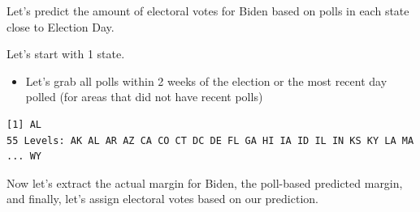 \documentclass[
  letterpaper,
  DIV=11,
  numbers=noendperiod]{scrreprt}
\newenvironment{Shaded}{\begin{snugshade}}{\end{snugshade}}
\newcommand{\DecValTok}[1]{\textcolor[rgb]{0.68,0.00,0.00}{#1}}
\newcommand{\DocumentationTok}[1]{\textcolor[rgb]{0.37,0.37,0.37}{\textit{#1}}}
\newcommand{\FunctionTok}[1]{\textcolor[rgb]{0.28,0.35,0.67}{#1}}
\newcommand{\NormalTok}[1]{\textcolor[rgb]{0.00,0.23,0.31}{#1}}
\newcommand{\OtherTok}[1]{\textcolor[rgb]{0.00,0.23,0.31}{#1}}
\newcommand{\SpecialCharTok}[1]{\textcolor[rgb]{0.37,0.37,0.37}{#1}}
\providecommand{\tightlist}{%
  \setlength{\itemsep}{0pt}\setlength{\parskip}{0pt}}\usepackage{longtable,booktabs,array}
\begin{document}
Let's predict the amount of electoral votes for Biden based on polls in
each state close to Election Day.

Let's start with 1 state.

\begin{itemize}
\tightlist
\item
  Let's grab all polls within 2 weeks of the election or the most recent
  day polled (for areas that did not have recent polls)
\end{itemize}

\begin{Shaded}
\end{Shaded}

\begin{verbatim}
[1] AL
55 Levels: AK AL AR AZ CA CO CT DC DE FL GA HI IA ID IL IN KS KY LA MA ... WY
\end{verbatim}

\begin{Shaded}
\end{Shaded}

Now let's extract the actual margin for Biden, the poll-based predicted
margin, and finally, let's assign electoral votes based on our
prediction.

\begin{Shaded}
\end{Shaded}
\end{document}
